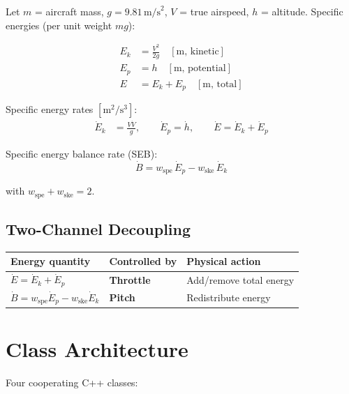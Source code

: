 \documentclass[12pt,a4paper]{article}
\begin{document}
Let $m$ = aircraft mass, $g = 9.81\,\text{m/s}^2$, $V$ = true airspeed,
$h$ = altitude. Specific energies (per unit weight $mg$):

\begin{align}
  E_k &= \frac{V^2}{2g} \quad [\text{m, kinetic}] \\
  E_p &= h \quad [\text{m, potential}] \\
  E   &= E_k + E_p \quad [\text{m, total}]
\end{align}

Specific energy rates $[\text{m}^2/\text{s}^3]$:
\begin{align}
  \dot{E}_k &= \frac{V\dot{V}}{g}, \qquad
  \dot{E}_p = \dot{h}, \qquad
  \dot{E}   = \dot{E}_k + \dot{E}_p
\end{align}

Specific energy balance rate (SEB):
\begin{equation}
  \dot{B} = w_{\text{spe}}\,\dot{E}_p - w_{\text{ske}}\,\dot{E}_k
  \label{eq:seb}
\end{equation}

with $w_{\text{spe}} + w_{\text{ske}} = 2$.

\subsection{Two-Channel Decoupling}

\begin{center}
\begin{tabular}{lll}
\toprule
Energy quantity & Controlled by & Physical action \\
\midrule
$\dot{E} = \dot{E}_k + \dot{E}_p$ & \textbf{Throttle} & Add/remove total energy \\
$\dot{B} = w_{\text{spe}}\dot{E}_p - w_{\text{ske}}\dot{E}_k$ & \textbf{Pitch} & Redistribute energy \\
\bottomrule
\end{tabular}
\end{center}

\section{Class Architecture}

Four cooperating C++ classes:

\begin{center}
\end{center}
\end{document}
